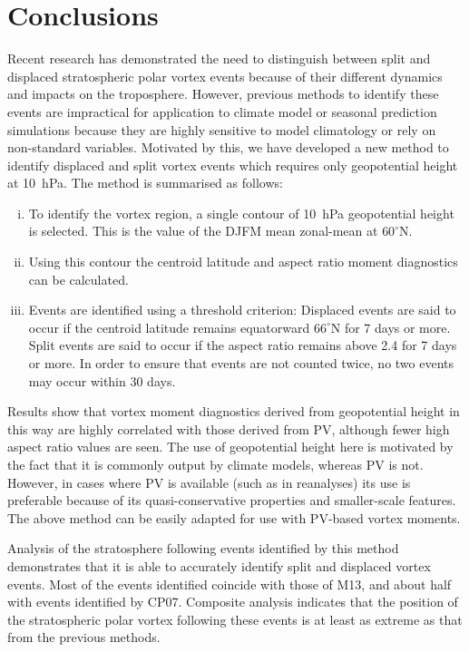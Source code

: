 \section{Conclusions}

Recent research has demonstrated the need to distinguish between split and
displaced stratospheric polar vortex events because of their different dynamics
and impacts on the troposphere. However, previous methods to identify these
events are impractical for application to climate model or seasonal prediction
simulations because they are highly sensitive to model climatology or rely on
non-standard variables. Motivated by this, we have developed a new method to
identify displaced and split vortex events which requires only geopotential
height at 10~hPa. The method is summarised as follows:
\begin{enumerate}[i.]
\item To identify the vortex region, a single contour of 10~hPa geopotential
  height is selected. This is the value of the DJFM mean zonal-mean at
  $60^{\circ}$N.
\item Using this contour the centroid latitude and aspect ratio moment
  diagnostics can be calculated.
\item Events are identified using a threshold criterion: Displaced events are
  said to occur if the centroid latitude remains equatorward $66^{\circ}$N for 7
  days or more. Split events are said to occur if the aspect ratio remains above
  2.4 for 7 days or more. In order to ensure that events are not counted twice,
  no two events may occur within 30 days.
\end{enumerate}
Results show that vortex moment diagnostics derived from geopotential height in
this way are highly correlated with those derived from PV, although fewer high
aspect ratio values are seen. The use of geopotential height here is motivated
by the fact that it is commonly output by climate models, whereas PV is
not. However, in cases where PV is available (such as in reanalyses) its use is
preferable because of its quasi-conservative properties and smaller-scale
features. The above method can be easily adapted for use with PV-based vortex
moments.

Analysis of the stratosphere following events identified by this method
demonstrates that it is able to accurately identify split and displaced vortex
events. Most of the events identified coincide with those of M13, and about
half with events identified by CP07. Composite analysis indicates that the
position of the stratospheric polar vortex following these events is at least as
extreme as that from the previous methods. 

